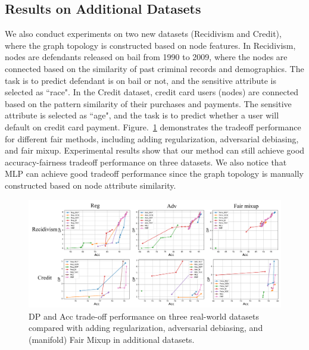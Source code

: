 \documentclass[letterpaper]{article} %
\theoremstyle{plain}
\theoremstyle{definition}
\theoremstyle{remark}
\begin{document}
\subsection{Results on Additional Datasets}

We also conduct experiments on two new datasets (Recidivism and Credit), where the graph topology is constructed based on node features.  In Recidivism, nodes are defendants
released on bail from 1990 to 2009, where the nodes are connected based on
the similarity of past criminal records and demographics. The task
is to predict defendant is on bail or not, and the
sensitive attribute is selected as ``race". In the Credit dataset, credit card
users (nodes) are connected based on the pattern similarity of
their purchases and payments. The sensitive attribute is selected as ``age",
and the task is to predict whether a user will default on credit card payment.
Figure.~\ref{fig:tradeoff_manual} demonstrates the tradeoff performance for different fair methods, including adding regularization, adversarial debiasing, and fair mixup.
Experimental results show that our method can still achieve good accuracy-fairness tradeoff performance on three datasets. We also notice that MLP can achieve good tradeoff performance since the graph topology is manually constructed based on node attribute similarity.

\begin{figure}[ht]
\centering
\includegraphics[width=0.8\linewidth]{Tradeoff_manual.pdf}

\caption{DP and Acc trade-off performance on three real-world datasets compared with adding regularization, adversarial debiasing, and (manifold) Fair Mixup in additional datasets.}
\label{fig:tradeoff_manual}
\end{figure}
\end{document}
